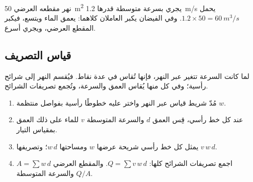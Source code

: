 نهر مقطعه العرضي \qty{50}{m^2} يجري بسرعة متوسطة قدرها
\qty{1.2}{m/s} يحمل $1.2 \times 50 = \qty{60}{m^3/s}$. وفي الفيضان يكبر العاملان
كلاهما: يعمق الماء ويتسع، فيكبر المقطع العرضي، ويجري
أسرع.

\subsection*{قياس التصريف}

لما كانت السرعة تتغير عبر النهر، فإنها تُقاس في عدة نقاط. فيُقسم النهر إلى شرائح
رأسية؛ وفي كل منها يُقاس العمق والسرعة، وتُجمع تصريفات
الشرائح.

\begin{method}\label{met:g10:drainage-basins:velocity-area}
\begin{enumerate}
  \item مُدّ شريط قياس عبر النهر واختر عليه خطوطًا رأسية بفواصل منتظمة
        $w$.
  \item عند كل خط رأسي، قِس العمق $d$ والسرعة المتوسطة $v$
        للماء على ذلك العمق بمقياس التيار.
  \item يمثل كل خط رأسي شريحة عرضها $w$ ومساحتها $w\,d$؛ وتصريفها
        $v\,w\,d$.
  \item اجمع تصريفات الشرائح كلها: $Q = \sum v\,w\,d$.
        والمقطع العرضي $A = \sum w\,d$ والسرعة المتوسطة $Q/A$.
\end{enumerate}
\end{method}

